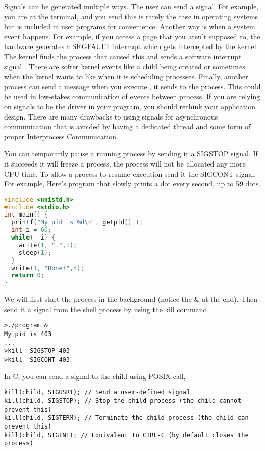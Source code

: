 Signals can be generated multiple ways. The user can send a signal. For example, you are at the terminal, and you send  this is rarely the case in operating systems but is included in user programs for convenience. Another way is when a system event happens. For example, if you access a page that you aren't supposed to, the hardware generates a SEGFAULT interrupt which gets intercepted by the kernel. The kernel finds the process that caused this and sends a software interrupt signal . There are softer kernel events like a child being created or sometimes when the kernel wants to like when it is scheduling processes. Finally, another process can send a message when you execute , it sends  to the process. This could be used in low-stakes communication of events between process. If you are relying on signals to be the driver in your program, you should rethink your application design. There are many drawbacks to using signals for asynchronous communication that is avoided by having a dedicated thread and some form of proper Interprocess Communication.

You can temporarily pause a running process by sending it a SIGSTOP signal. If it succeeds it will freeze a process, the process will not be allocated any more CPU time. To allow a process to resume execution send it the SIGCONT signal. For example, Here's program that slowly prints a dot every second, up to 59 dots.

\begin{lstlisting}[language=C]
#include <unistd.h>
#include <stdio.h>
int main() {
  printf("My pid is %d\n", getpid() );
  int i = 60;
  while(--i) {
    write(1, ".",1);
    sleep(1);
  }
  write(1, "Done!",5);
  return 0;
}
\end{lstlisting}

We will first start the process in the background (notice the \& at the end). Then send it a signal from the shell process by using the kill command.

\begin{verbatim}
>./program &
My pid is 403
...
>kill -SIGSTOP 403
>kill -SIGCONT 403
\end{verbatim}

In C, you can send a signal to the child using  POSIX call,

\begin{verbatim}
kill(child, SIGUSR1); // Send a user-defined signal
kill(child, SIGSTOP); // Stop the child process (the child cannot prevent this)
kill(child, SIGTERM); // Terminate the child process (the child can prevent this)
kill(child, SIGINT); // Equivalent to CTRL-C (by default closes the process)
\end{verbatim}

